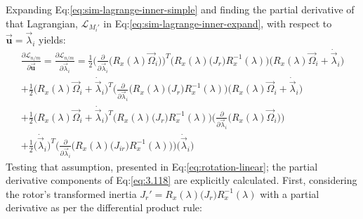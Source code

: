 Expanding Eq:\ref{eq:sim-lagrange-inner-simple} and finding the partial derivative of that Lagrangian, $\mathcal{L}_{M_i'}$ in Eq:\ref{eq:sim-lagrange-inner-expand}, with respect to $\vec{\mathbf{u}}=\vec{\lambda}_i$ yields:
\begin{multline}\label{eq:3.118}
\frac{\partial\mathcal{L}_{n/m}}{\partial\vec{\mathbf{u}}}=\frac{\partial\mathcal{L}_{n/m}}{\partial\vec{\lambda}_i}=\frac{1}{2}\bigg(\frac{\partial}{\partial\vec{\lambda}_i}\Big(R_x(\lambda)\vec{\Omega}_i\Big)\bigg)^T\Big(R_x(\lambda)\big(J_r\big)R_x^{-1}(\lambda)\Big)\Big(R_x(\lambda)\vec{\Omega}_i+\dot{\vec{\lambda}}_i\Big)
\\
+\frac{1}{2}\Big(R_x(\lambda)\vec{\Omega}_i+\dot{\vec{\lambda}}_i\Big)^T\bigg(\frac{\partial}{\partial\vec{\lambda}_i}\Big(R_x(\lambda)\big(J_r\big)R_x^{-1}(\lambda)\Big)\bigg(R_x(\lambda)\vec{\Omega}_i+\dot{\vec{\lambda}}_i\Big)
\\
+\frac{1}{2}\Big(R_x(\lambda)\vec{\Omega}_i+\dot{\vec{\lambda}}_i\Big)^T\Big(R_x(\lambda)\big(J_r\big)R_x^{-1}(\lambda)\Big)\bigg(\frac{\partial}{\partial\vec{\lambda}_i}\Big(R_x(\lambda)\vec{\Omega}_i\Big)\bigg)
\\
+\frac{1}{2}\Big(\dot{\vec{\lambda}}_i\Big)^T\bigg(\frac{\partial}{\partial\vec{\lambda}_i}\Big(R_x(\lambda)\big(J_{ir}\big)R_x^{-1}(\lambda)\Big)\bigg)\Big(\dot{\vec{\lambda}}_i\Big)
\end{multline}
Testing that assumption, presented in Eq:\ref{eq:rotation-linear}; the partial derivative components of Eq:\ref{eq:3.118} are explicitly calculated. First, considering the rotor's transformed inertia $J_r'=R_x(\lambda)\big(J_r\big)R_x^{-1}(\lambda)$ with a partial derivative as per the differential product rule:
